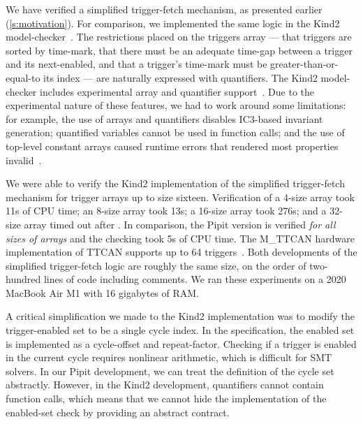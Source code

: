 We have verified a simplified trigger-fetch mechanism, as presented earlier (\autoref{s:motivation}).
For comparison, we implemented the same logic in the Kind2 model-checker~\cite{champion2016kind2}.
The restrictions placed on the triggers array --- that triggers are sorted by time-mark, that there must be an adequate time-gap between a trigger and its next-enabled, and that a trigger's time-mark must be greater-than-or-equal-to its index --- are naturally expressed with quantifiers.
The Kind2 model-checker includes experimental array and quantifier support~\cite{kind2userdoc}.
Due to the experimental nature of these features, we had to work around some limitations: for example, the use of arrays and quantifiers disables IC3-based invariant generation; quantified variables cannot be used in function calls; and the use of top-level constant arrays caused runtime errors that rendered most properties invalid~\cite{kind2024toparray}.

We were able to verify the Kind2 implementation of the simplified trigger-fetch mechanism for trigger arrays up to size sixteen.
Verification of a 4-size array took 11s of CPU time; an 8-size array took 13s; a 16-size array took 276s; and a 32-size array timed out after .
In comparison, the Pipit version is verified \emph{for all sizes of arrays} and the checking took 5s of CPU time.
The M_TTCAN hardware implementation of TTCAN supports up to 64 triggers~\cite{bosch2019mttcan}.
Both developments of the simplified trigger-fetch logic are roughly the same size, on the order of two-hundred lines of code including comments.
We ran these experiments on a 2020 MacBook Air M1 with 16 gigabytes of RAM.

A critical simplification we made to the Kind2 implementation was to modify the trigger-enabled set to be a single cycle index.
In the specification, the enabled set is implemented as a cycle-offset and repeat-factor.
Checking if a trigger is enabled in the current cycle requires nonlinear arithmetic, which is difficult for SMT solvers.
In our Pipit development, we can treat the definition of the cycle set abstractly.
However, in the Kind2 development, quantifiers cannot contain function calls, which means that we cannot hide the implementation of the enabled-set check by providing an abstract contract.


